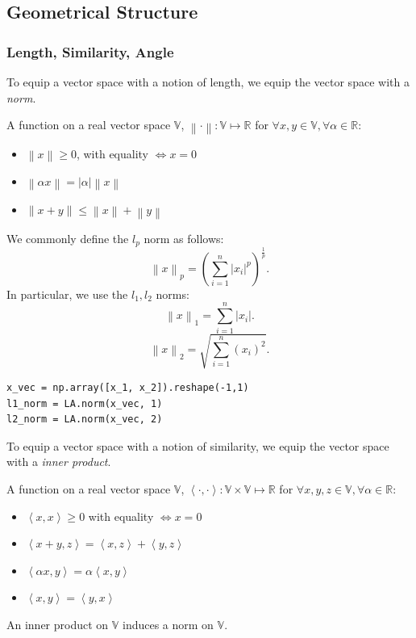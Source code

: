 \subsection{Geometrical Structure}
\subsubsection{Length, Similarity, Angle}
To equip a vector space with a notion of length, we equip the vector space with
a \emph{norm}.
\begin{definition}[Norm]
  A function on a real vector space $\mathbb{V}$, $\left \lVert \cdot
  \right\rVert : \mathbb{V}\mapsto \mathbb{R}$ for $\forall x,y\in
  \mathbb{V}, \forall\alpha\in \mathbb{R}$:
  \begin{itemize}
    \item $\left \lVert x \right \rVert \ge 0 $, with equality $\iff x=0$
    \item $\left \lVert \alpha x \right \rVert =\left| \alpha \right| \left \lVert x \right \rVert$
    \item $\left \lVert x+y \right \rVert\le \left \lVert x \right \rVert+\left \lVert y \right \rVert$
  \end{itemize}
\end{definition}
\begin{example}[Norms]
  We commonly define the $l_p$ norm as follows:
  \[\left \lVert x \right \rVert_p = {(\sum_{i=1}^{n} \left| x_i \right| ^{p})}^{\frac{1}{p}}.\] 
  In particular, we use the $l_1,l_2$ norms:
  \[\left \lVert x \right \rVert_1 = \sum_{i=1}^{n} \left| x_i \right|.\] 
  \[\left \lVert x\right \rVert_2 = \sqrt{\sum_{i=1}^{n} {(x_i)}^{2}}.\] 
\end{example}
\begin{lstlisting}
x_vec = np.array([x_1, x_2]).reshape(-1,1)
l1_norm = LA.norm(x_vec, 1)
l2_norm = LA.norm(x_vec, 2)
\end{lstlisting}
To equip a vector space with a notion of similarity, we equip the vector space with
a \emph{inner product}.
\begin{definition}[Norm]
  A function on a real vector space $\mathbb{V}$, $\left<\cdot,\cdot \right> :
  \mathbb{V}\times \mathbb{V}\mapsto \mathbb{R}$ for $\forall x,y,z\in
  \mathbb{V},\forall\alpha\in \mathbb{R}$:
  \begin{itemize}
    \item $\left<x,x \right> \ge 0$ with equality $\iff x=0$ 
    \item $\left<x+y,z \right> =\left<x,z \right> +\left<y,z \right>$
    \item $\left<\alpha x,y \right> =\alpha\left< x,y\right> $
    \item $\left<x,y \right> =\left<y,x \right> $
  \end{itemize}
  An inner product on $\mathbb{V}$ induces a norm on $\mathbb{V}$.
\end{definition}
